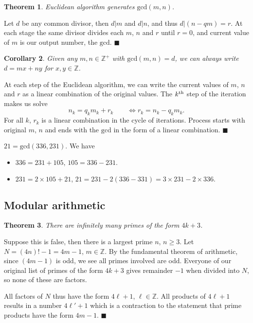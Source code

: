 \documentclass[letter-paper]{tufte-book}
\newtheorem{theorem}{\color{pastel-blue}Theorem}[section]
\newtheorem{corollary}[theorem]{\color{pastel-blue}Corollary}
\newenvironment{proof}[1][Proof]{\begin{trivlist}
\item[\hskip \labelsep {\bfseries #1}]}{\end{trivlist}}
\newenvironment{example}[1][Example]{\begin{trivlist}
\item[\hskip \labelsep {\bfseries #1}]}{\end{trivlist}}
\newcommand{\qed}{\hfill$\blacksquare$}
\begin{document}
\begin{theorem}
  Euclidean algorithm generates $\mbox{gcd}(m,n)$.
\end{theorem}
\begin{proof}
  Let $d$ be any common divisor, then $d|m$ and $d|n$, and thus $d|(n-qm)=r$. At
  each stage the same divisor divides each $m$, $n$ and $r$ until $r=0$, and
  current value of $m$ is our output number, the $\mbox{gcd}$. \qed
\end{proof}

\begin{corollary}
  Given any $m,n\in\mathbb{Z}^+$ with $\mbox{gcd}(m,n)=d$, we can always write
  $d=mx+ny$ for $x,y\in\mathbb{Z}$.
\end{corollary}
\begin{proof}
  At each step of the Euclidean algorithm, we can write the current values of
  $m$, $n$ and $r$ as a linear combination of the original values. The
  $k^{\textnormal{th}}$ step of the iteration makes us solve
  \begin{equation*}
    n_k = q_k m_k + r_k\qquad\Leftrightarrow r_k = n_k - q_k m_k.
  \end{equation*}
  For all $k$, $r_k$ is a linear combination in the cycle of iterations. Process
  starts with original $m$, $n$ and ends with the $\mbox{gcd}$ in the form of a
  linear combination. \qed
\end{proof}
\begin{example}
  $21=\mbox{gcd}(336,231)$. We have
  \begin{itemize}
    \item $336=231+105$, $105=336-231$.
    \item $231=2\times105+21$, $21=231-2(336-331)=3\times231-2\times336$.
  \end{itemize}
\end{example}


\subsection{Modular arithmetic}

\begin{theorem}
  There are infinitely many primes of the form $4k+3$.
\end{theorem}
\begin{proof}
  Suppose this is false, then there is a largest prime $n$, $n\geq3$. Let
  $N=(4n)!-1=4m-1$, $m\in\mathbb{Z}$. By the fundamental theorem of arithmetic,
  since $(4m-1)$ is odd, we see all primes involved are odd. Everyone of our
  original list of primes of the form $4k+3$ gives remainder $-1$ when divided
  into $N$, so none of these are factors.
  
  All factors of $N$ thus have the form $4\ell+1$, $\ell\in\mathbb{Z}$. All
  products of $4\ell+1$ results in a number $4\ell'+1$ which is a contraction to
  the statement that prime products have the form $4m-1$. \qed
\end{proof}
\end{document}
